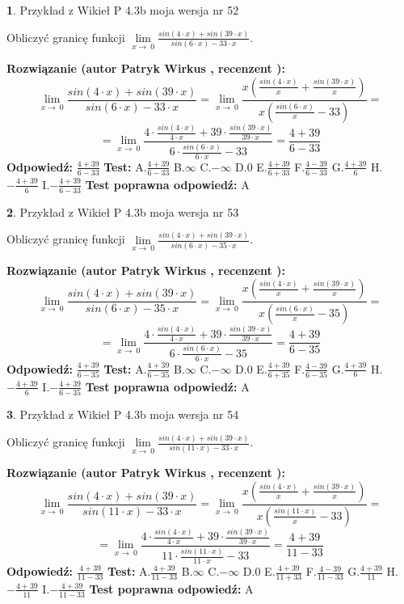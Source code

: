 \documentclass[12pt, a4paper]{article}
\theoremstyle{definition} %
\newtheorem{zad}{}
\newcommand{\zadStart}[1]{\begin{zad}#1\newline}
\newcommand{\zadStop}{\end{zad}}
\newcommand{\rozwStart}[2]{\noindent \textbf{Rozwiązanie (autor #1 , recenzent #2): }\newline}
\newcommand{\rozwStop}{\newline}
\newcommand{\odpStart}{\noindent \textbf{Odpowiedź:}\newline}
\newcommand{\odpStop}{\newline}
\newcommand{\testStart}{\noindent \textbf{Test:}\newline}
\newcommand{\testStop}{\newline}
\newcommand{\kluczStart}{\noindent \textbf{Test poprawna odpowiedź:}\newline}
\newcommand{\kluczStop}{\newline}
\begin{document}
\zadStart{Przykład z Wikieł P 4.3b moja wersja nr 52}


Obliczyć granicę funkcji $\lim\limits_{x\to\ 0}\frac{sin(4 \cdot x)+sin(39 \cdot x)}{sin(6 \cdot x)-33 \cdot x}$.
\zadStop
\rozwStart{Patryk Wirkus}{}
$$\lim\limits_{x\to\ 0}\frac{sin(4 \cdot x)+sin(39 \cdot x)}{sin(6 \cdot x)-33 \cdot x}=\lim\limits_{x\to\ 0}\frac{x(\frac{sin(4 \cdot x)}{x}+\frac{sin(39 \cdot x)}{x})}{x(\frac{sin(6 \cdot x)}{x}-33)}=$$
$$=\lim\limits_{x\to\ 0}\frac{4 \cdot \frac{sin(4 \cdot x)}{4 \cdot x}+39 \cdot \frac{sin(39 \cdot x)}{39 \cdot x}}{6 \cdot \frac{sin(6 \cdot x)}{6 \cdot x}-33}=\frac{4+39}{6-33}$$
\rozwStop
\odpStart
$\frac{4+39}{6-33}$
\odpStop
\testStart
A.$\frac{4+39}{6-33}$
B.$\infty$
C.$-\infty$
D.$0$
E.$\frac{4+39}{6+33}$
F.$\frac{4-39}{6-33}$
G.$\frac{4+39}{6}$
H.$-\frac{4+39}{6}$
I.$-\frac{4+39}{6-33}$
\testStop
\kluczStart
A
\kluczStop



\zadStart{Przykład z Wikieł P 4.3b moja wersja nr 53}


Obliczyć granicę funkcji $\lim\limits_{x\to\ 0}\frac{sin(4 \cdot x)+sin(39 \cdot x)}{sin(6 \cdot x)-35 \cdot x}$.
\zadStop
\rozwStart{Patryk Wirkus}{}
$$\lim\limits_{x\to\ 0}\frac{sin(4 \cdot x)+sin(39 \cdot x)}{sin(6 \cdot x)-35 \cdot x}=\lim\limits_{x\to\ 0}\frac{x(\frac{sin(4 \cdot x)}{x}+\frac{sin(39 \cdot x)}{x})}{x(\frac{sin(6 \cdot x)}{x}-35)}=$$
$$=\lim\limits_{x\to\ 0}\frac{4 \cdot \frac{sin(4 \cdot x)}{4 \cdot x}+39 \cdot \frac{sin(39 \cdot x)}{39 \cdot x}}{6 \cdot \frac{sin(6 \cdot x)}{6 \cdot x}-35}=\frac{4+39}{6-35}$$
\rozwStop
\odpStart
$\frac{4+39}{6-35}$
\odpStop
\testStart
A.$\frac{4+39}{6-35}$
B.$\infty$
C.$-\infty$
D.$0$
E.$\frac{4+39}{6+35}$
F.$\frac{4-39}{6-35}$
G.$\frac{4+39}{6}$
H.$-\frac{4+39}{6}$
I.$-\frac{4+39}{6-35}$
\testStop
\kluczStart
A
\kluczStop



\zadStart{Przykład z Wikieł P 4.3b moja wersja nr 54}


Obliczyć granicę funkcji $\lim\limits_{x\to\ 0}\frac{sin(4 \cdot x)+sin(39 \cdot x)}{sin(11 \cdot x)-33 \cdot x}$.
\zadStop
\rozwStart{Patryk Wirkus}{}
$$\lim\limits_{x\to\ 0}\frac{sin(4 \cdot x)+sin(39 \cdot x)}{sin(11 \cdot x)-33 \cdot x}=\lim\limits_{x\to\ 0}\frac{x(\frac{sin(4 \cdot x)}{x}+\frac{sin(39 \cdot x)}{x})}{x(\frac{sin(11 \cdot x)}{x}-33)}=$$
$$=\lim\limits_{x\to\ 0}\frac{4 \cdot \frac{sin(4 \cdot x)}{4 \cdot x}+39 \cdot \frac{sin(39 \cdot x)}{39 \cdot x}}{11 \cdot \frac{sin(11 \cdot x)}{11 \cdot x}-33}=\frac{4+39}{11-33}$$
\rozwStop
\odpStart
$\frac{4+39}{11-33}$
\odpStop
\testStart
A.$\frac{4+39}{11-33}$
B.$\infty$
C.$-\infty$
D.$0$
E.$\frac{4+39}{11+33}$
F.$\frac{4-39}{11-33}$
G.$\frac{4+39}{11}$
H.$-\frac{4+39}{11}$
I.$-\frac{4+39}{11-33}$
\testStop
\kluczStart
A
\kluczStop
\end{document}
